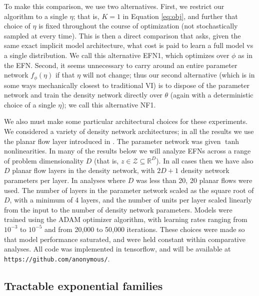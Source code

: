 \documentclass[twoside]{article}
\begin{document}
To make this comparison, we use two alternatives.  First, we restrict our algorithm to a single $\eta$; that is, $K=1$ in Equation \ref{eq:obj}, and further that choice of $\eta$ is fixed throughout the course of optimization (not stochastically sampled at every time).  This is then a direct comparison that asks, given the same exact implicit model architecture, what cost is paid to learn a full model vs a single distribution.  We call this alternative EFN1, which optimizes over $\phi$ as in the EFN.      Second, it seems unnecessary to carry around an entire parameter network $f_\phi(\eta)$ if that $\eta$ will not change; thus our second alternative (which is in some ways mechanically closest to traditional VI) is to dispose of the parameter network and train the density network directly over $\theta$ (again with a deterministic choice of a single $\eta$); we call this alternative NF1.

We also must make some particular architectural choices for these experiments.  
We considered a variety of density network architectures; in all the results we use the planar flow layer introduced in \cite{rezende2015variational}.  
The parameter network was given $\tanh$ nonlinearities.
%
In many of the results below we will analyze EFNs across a range of problem dimensionality $D$ (that is, $z \in \mathcal{Z} \subseteq \mathbb{R}^D$).    In all cases then we have also $D$ planar flow layers in the density network, with $2D+1$ density network parameters per layer.  In analyses where $D$ was less than 20, 20 planar flows were used.  The number of layers in the parameter network scaled as the square root of $D$, with a minimum of 4 layers, and the number of units per layer scaled linearly from the input to the number of density network parameters. Models were trained using the ADAM optimizer algorithm, with learning rates ranging from $10^{-3}$ to $10^{-5}$ and from 20,000 to 50,000 iterations.  These choices were made so that model performance saturated, and were held constant within comparative analyses.
%
All code was implemented in tensorflow, and will be available at {\tt https://github.com/anonymous/}.

\subsection{Tractable exponential families}
\end{document}
